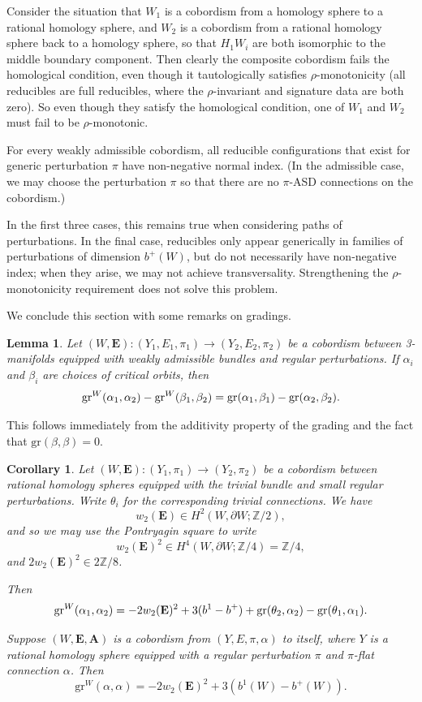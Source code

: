 \documentclass[10pt,a4paper]{amsart}
\newtheorem{lemma}[theorem]{Lemma}
\newtheorem{corollary}[theorem]{Corollary}
\theoremstyle{definition}
\theoremstyle{remark}
\numberwithin{figure}{qchap}
\begin{document}
Consider the situation that $W_1$ is a cobordism from a homology sphere to a rational homology sphere, and $W_2$ is a cobordism from a rational homology sphere back to a homology sphere, so that $H_1 W_i$ are both isomorphic to the middle boundary component. Then clearly the composite cobordism fails the homological condition, even though it tautologically satisfies $\rho$-monotonicity (all reducibles are full reducibles, where the $\rho$-invariant and signature data are both zero). So even though they satisfy the homological condition, one of $W_1$ and $W_2$ must fail to be $\rho$-monotonic. 

For every weakly admissible cobordism, all reducible configurations that exist for generic perturbation $\pi$ have non-negative normal index. (In the admissible case, we may choose the perturbation $\pi$ so that there are no $\pi$-ASD connections on the cobordism.)

In the first three cases, this remains true when considering paths of perturbations. In the final case, reducibles only appear generically in families of perturbations of dimension $b^+(W)$, but do not necessarily have non-negative index; when they arise, we may not achieve transversality. Strengthening the $\rho$-monotonicity requirement does not solve this problem.

We conclude this section with some remarks on gradings.

\begin{lemma}\label{cob-grading-rel}
Let $(W,\mathbf{E}): (Y_1,E_1,\pi_1) \to (Y_2, E_2,\pi_2)$ be a cobordism between 3-manifolds equipped with weakly admissible bundles and regular perturbations. If $\alpha_i$ and $\beta_i$ are choices of critical orbits, then $$\textup{gr}^W(\alpha_1, \alpha_2) - \textup{gr}^W(\beta_1, \beta_2) =  \textup{gr}(\alpha_1, \beta_1) - \textup{gr}(\alpha_2, \beta_2).$$
\end{lemma}
This follows immediately from the additivity property of the grading and the fact that $\text{gr}(\beta, \beta) = 0$.

\begin{corollary}\label{cob-grading-abs}Let $(W,\mathbf{E}): (Y_1, \pi_1) \to (Y_2, \pi_2)$ be a cobordism between rational homology spheres equipped with the trivial bundle and small regular perturbations. Write $\theta_i$ for the corresponding trivial connections. We have 
$$w_2(\mathbf{E}) \in H^2(W, \partial W;\mathbb Z/2),$$
and so we may use the Pontryagin square to write 
$$w_2(\mathbf{E})^2 \in H^4(W,\partial W;\mathbb Z/4) = \mathbb Z/4,$$ 
and $2w_2(\mathbf{E})^2 \in 2\mathbb Z/8$.

Then $$\textup{gr}^W(\alpha_1, \alpha_2) = -2w_2(\mathbf{E})^2  +3(b^1 - b^+) + \textup{gr}(\theta_2, \alpha_2) - \textup{gr}(\theta_1, \alpha_1).$$

Suppose $(W,\mathbf{E},\mathbf{A})$ is a cobordism from $(Y,E,\pi,\alpha)$ to itself, where $Y$ is a rational homology sphere equipped with a regular perturbation $\pi$ and $\pi$-flat connection $\alpha$. Then $$\text{gr}^W(\alpha, \alpha) = -2w_2(\mathbf{E})^2 + 3(b^1(W)-b^+(W)).$$
\end{corollary}
\end{document}
